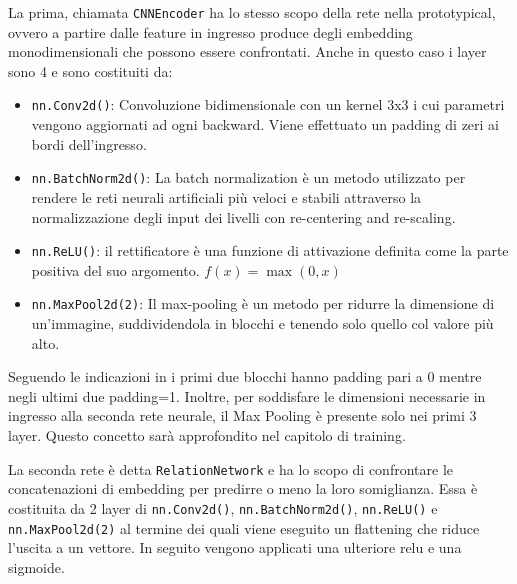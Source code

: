 \documentclass[12pt,a4paper,titlepage]{article}
\begin{document}
La prima, chiamata \texttt{CNNEncoder} ha lo stesso scopo della rete nella prototypical, ovvero a partire dalle feature in ingresso produce degli embedding monodimensionali che possono essere confrontati.
Anche in questo caso i layer sono 4 e sono costituiti da:
\begin{itemize}
	\item \texttt{nn.Conv2d()}: Convoluzione bidimensionale con un kernel 3x3 i cui parametri vengono aggiornati ad ogni backward. Viene effettuato un padding di zeri ai bordi dell'ingresso.
	\item \texttt{nn.BatchNorm2d()}: La batch normalization è un metodo utilizzato per rendere le reti neurali artificiali più veloci e stabili attraverso la normalizzazione degli input dei livelli con re-centering and re-scaling.
	\item \texttt{nn.ReLU()}: il rettificatore è una funzione di attivazione definita come la parte positiva del suo argomento. $f(x)=\max(0,x)$
	\item \texttt{nn.MaxPool2d(2)}: Il max-pooling è un metodo per ridurre la dimensione di un’immagine, suddividendola in blocchi e tenendo solo quello col valore più alto.
\end{itemize}
Seguendo le indicazioni in \cite{DBLP:journals/corr/abs-1711-06025} i primi due blocchi hanno padding pari a 0 mentre negli ultimi due padding=1.
Inoltre, per soddisfare le dimensioni necessarie in ingresso alla seconda rete neurale, il Max Pooling è presente solo nei primi 3 layer. Questo concetto sarà approfondito nel capitolo di training.

La seconda rete è detta \texttt{RelationNetwork} e ha lo scopo di confrontare le concatenazioni di embedding per predirre o meno la loro somiglianza.
Essa è costituita da 2 layer di \texttt{nn.Conv2d()}, \texttt{nn.BatchNorm2d()}, \texttt{nn.ReLU()} e \texttt{nn.MaxPool2d(2)} al termine dei quali viene eseguito un flattening che riduce l'uscita a un vettore.
In seguito vengono applicati una ulteriore relu e una sigmoide.
\end{document}
